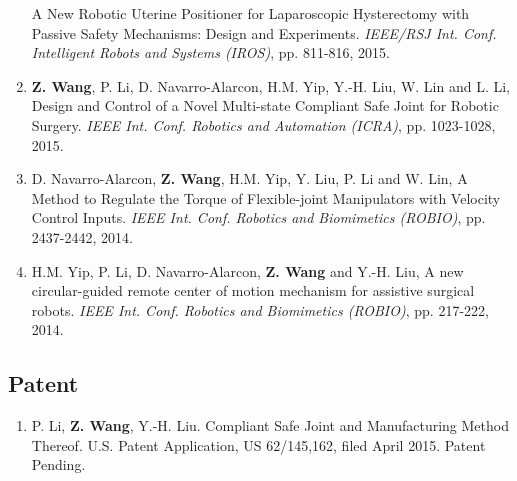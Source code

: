 \documentclass[10pt,letterpaper]{article}
\begin{document}
\begin{enumerate}
  A New Robotic Uterine Positioner for Laparoscopic Hysterectomy with Passive Safety Mechanisms: Design and Experiments.
  \textit{{IEEE/RSJ} Int. Conf. Intelligent Robots and Systems (IROS)}, pp. 811-816, 2015.
\item \textbf{Z. Wang}, P. Li, D. Navarro-Alarcon, H.M. Yip, Y.-H. Liu, W. Lin and L. Li,
  Design and Control of a Novel Multi-state Compliant Safe Joint for Robotic Surgery.
  \textit{{IEEE} Int. Conf. Robotics and Automation (ICRA)}, pp. 1023-1028, 2015.
\item D. Navarro-Alarcon, \textbf{Z. Wang}, H.M. Yip, Y. Liu, P. Li and W. Lin,
  A Method to Regulate the Torque of Flexible-joint Manipulators with Velocity Control Inputs.
  \textit{{IEEE} Int. Conf. Robotics and Biomimetics (ROBIO)}, pp. 2437-2442, 2014.
\item H.M. Yip, P. Li, D. Navarro-Alarcon, \textbf{Z. Wang} and Y.-H. Liu,
  A new circular-guided remote center of motion mechanism for assistive surgical robots.
  \textit{{IEEE} Int. Conf. Robotics and Biomimetics (ROBIO)}, pp. 217-222, 2014.
\end{enumerate}

\subsection*{Patent}
\begin{enumerate}
\item P. Li, \textbf{Z. Wang}, Y.-H. Liu.
  Compliant Safe Joint and Manufacturing Method Thereof.
  U.S. Patent Application, US 62/145,162, filed April 2015. Patent Pending.
\end{enumerate}

\end{document}
